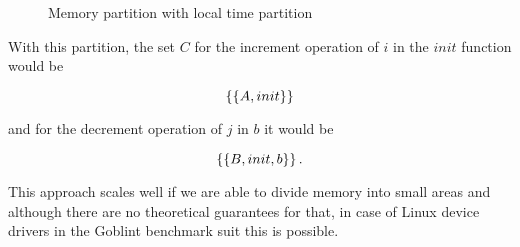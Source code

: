 \documentclass[..thesis.tex]{subfiles}
\newcommand{\opacity}{0.8}
\newcommand{\drawcube}[7]
{
      \filldraw[opacity=\opacity, #7, draw=black, dashed, xzp=#2] (#1,#3) rectangle (#4,#6);
      \filldraw[opacity=\opacity, #7, draw=black, dashed, xzp=#5] (#1,#3) rectangle (#4,#6);
      \filldraw[opacity=\opacity, #7, draw=black, dashed, xyp=#3] (#1,#2) rectangle (#4,#5);
      \filldraw[opacity=\opacity, #7, draw=black, dashed, xyp=#6] (#1,#2) rectangle (#4,#5);
      \filldraw[opacity=\opacity, #7, draw=black, dashed, yzp=#4] (#2,#3) rectangle (#5,#6);
}
\newcommand{\drawcubeoverz}[5]
{
 \drawcube{#1}{#2}{0}{#3}{#4}{\cubez}{#5}
}
\newcommand{\drawoutercube}
{
      \draw[thick,-] (0,0,0) -- ++(\cubex,0,0) -- ++(0,0,\cubez) -- node [anchor = north] {$B$} ++(-0.5*\cubex,0,0) --  node [anchor = north] {$A$} ++(-0.5*\cubex,0,0)  --   ++(0,0,-\cubez);
      \draw[thick,-] (0,\cubey,0) -- ++(\cubex,0,0) -- ++(0,0,\cubez) -- ++(-\cubex,0,0) --   ++(0,0,-\cubez)  ;

      \draw[thick,-] (0,0,0) -- (0,\cubey,0);
      \draw[thick,-] (\cubex,0,0) -- (\cubex,\cubey,0);
      \draw[thick,-] (\cubex,0,\cubez) -- ++(0,\cubey,0);
      \draw[thick,-] (0,0,\cubez) -- (0,\cubey,\cubez);
}
\newcommand{\defaultPColor}{yellow}
\newcommand{\defaultPRColor}{\defaultPColor!75}
\newcommand{\aColor}{blue}
\newcommand{\aRColor}{\aColor!75}
\newcommand{\bColor}{green}
\newcommand{\bRColor}{\bColor!95}
\newcommand{\defaultColor}{red}
\newcommand{\defaultRColor}{\defaultColor!75}
\begin{document}
\begin{figure}[H]
  \centering
    \caption{Memory partition with local time partition}
\end{figure}

With this partition, the set $C$ for the increment operation of $i$ in the $init$ function would be

\begin{equation*}
\left\lbrace \left\lbrace A, init \right\rbrace \right\rbrace
\end{equation*}

and for the decrement operation of $j$ in $b$ it would be

\begin{equation*}
\left\lbrace \left\lbrace B, init, b \right\rbrace \right\rbrace \text{.}
\end{equation*}


This approach scales well if we are able to divide memory into small areas and although there are no theoretical guarantees for that,
in case of Linux device drivers in the Goblint benchmark suit this is possible.
\end{document}
